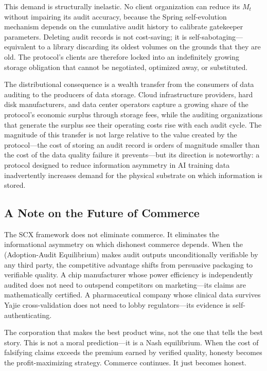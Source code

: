 \documentclass[12pt,a4paper]{article}
\theoremstyle{definition}
\theoremstyle{remark}
\begin{document}
This demand is structurally inelastic. No client organization can reduce its $M_t$ without impairing its audit accuracy, because the Spring self-evolution mechanism depends on the cumulative audit history to calibrate gatekeeper parameters. Deleting audit records is not cost-saving; it is self-sabotaging—equivalent to a library discarding its oldest volumes on the grounds that they are old. The protocol's clients are therefore locked into an indefinitely growing storage obligation that cannot be negotiated, optimized away, or substituted.

The distributional consequence is a wealth transfer from the consumers of data auditing to the producers of data storage. Cloud infrastructure providers, hard disk manufacturers, and data center operators capture a growing share of the protocol's economic surplus through storage fees, while the auditing organizations that generate the surplus see their operating costs rise with each audit cycle. The magnitude of this transfer is not large relative to the value created by the protocol—the cost of storing an audit record is orders of magnitude smaller than the cost of the data quality failure it prevents—but its direction is noteworthy: a protocol designed to reduce information asymmetry in AI training data inadvertently increases demand for the physical substrate on which information is stored.

\subsection{A Note on the Future of Commerce}

The SCX framework does not eliminate commerce. It eliminates the informational asymmetry on which dishonest commerce depends. When the  (Adoption-Audit Equilibrium) makes audit outputs unconditionally verifiable by any third party, the competitive advantage shifts from persuasive packaging to verifiable quality. A chip manufacturer whose power efficiency is independently audited does not need to outspend competitors on marketing—its claims are mathematically certified. A pharmaceutical company whose clinical data survives Yajie cross-validation does not need to lobby regulators—its evidence is self-authenticating.

The corporation that makes the best product wins, not the one that tells the best story. This is not a moral prediction—it is a Nash equilibrium. When the cost of falsifying claims exceeds the premium earned by verified quality, honesty becomes the profit-maximizing strategy. Commerce continues. It just becomes honest.
\end{document}
